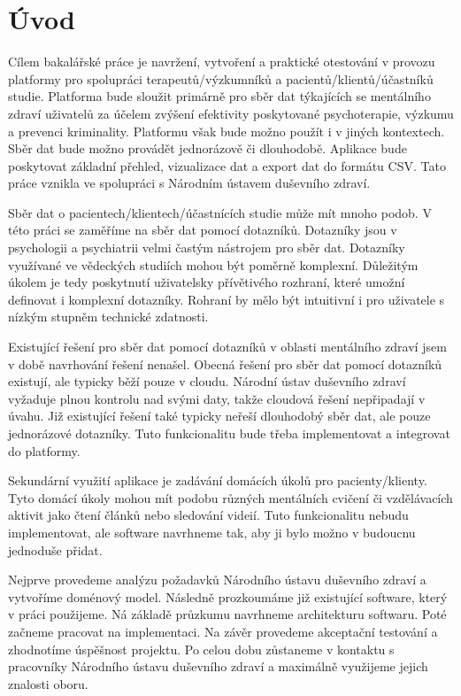\chapter*{Úvod}

Cílem bakalářské práce je navržení, vytvoření a praktické otestování v provozu platformy pro spolupráci terapeutů/výzkumníků a pacientů/klientů/účastníků studie.
Platforma bude sloužit primárně pro sběr dat týkajících se mentálního zdraví uživatelů za účelem zvýšení efektivity poskytované psychoterapie, výzkumu a prevenci kriminality. 
Platformu však bude možno použít i v jiných kontextech.
Sběr dat bude možno provádět jednorázově či dlouhodobě.
Aplikace bude poskytovat základní přehled, vizualizace dat a export dat do formátu CSV.
Tato práce vznikla ve spolupráci s Národním ústavem duševního zdraví.

Sběr dat o pacientech/klientech/účastnících studie může mít mnoho podob.
V této práci se zaměříme na sběr dat pomocí dotazníků. 
Dotazníky jsou v psychologii a psychiatrii velmi častým nástrojem pro sběr dat. 
Dotazníky využívané ve vědeckých studiích mohou být poměrně komplexní. 
Důležitým úkolem je tedy poskytnutí uživatelsky přívětivého rozhraní, které umožní definovat i komplexní dotazníky. 
Rohraní by mělo být intuitivní i pro uživatele s nízkým stupněm technické zdatnosti.

Existující řešení pro sběr dat pomocí dotazníků v oblasti mentálního zdraví jsem v době navrhování řešení nenašel. 
Obecná řešení pro sběr dat pomocí dotazníků existují, ale typicky běží pouze v cloudu. 
Národní ústav duševního zdraví vyžaduje plnou kontrolu nad svými daty, takže cloudová řešení nepřipadají v úvahu. 
Již existující řešení také typicky neřeší dlouhodobý sběr dat, ale pouze jednorázové dotazníky. 
Tuto funkcionalitu bude třeba implementovat a integrovat do platformy.

Sekundární využití aplikace je zadávání domácích úkolů pro pacienty/klienty.
Tyto domácí úkoly mohou mít podobu různých mentálních cvičení či vzdělávacích aktivit jako čtení článků nebo sledování videií. 
Tuto funkcionalitu nebudu implementovat, ale software navrhneme tak, aby ji bylo možno v budoucnu jednoduše přidat.

Nejprve provedeme analýzu požadavků Národního ústavu duševního zdraví a vytvoříme doménový model. 
Následně prozkoumáme již existující software, který v práci použijeme. 
Ná základě průzkumu navrhneme architekturu softwaru.
Poté začneme pracovat na implementaci. 
Na závěr provedeme akceptační testování a zhodnotíme úspěšnost projektu. 
Po celou dobu zůstaneme v kontaktu s pracovníky Národního ústavu duševního zdraví a maximálně využijeme jejich znalosti oboru.